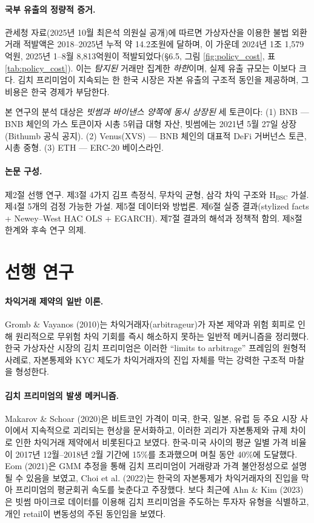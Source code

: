 \documentclass[11pt,a4paper]{article}
\begin{document}
\paragraph{국부 유출의 정량적 증거.}
관세청 자료(2025년 10월 최은석 의원실 공개)에 따르면 가상자산을 이용한 불법 외환거래
적발액은 2018--2025년 누적 약 14.2조원에 달하며, 이 가운데 2024년 1조 1,579억원,
2025년 1--8월 8,813억원이 적발되었다(\S6.5, 그림 \ref{fig:policy_cost}, 표 \ref{tab:policy_cost}).
이는 \emph{탐지된} 거래만 집계한 \emph{하한}이며, 실제 유출 규모는 이보다 크다. 김치 프리미엄이
지속되는 한 한국 시장은 자본 유출의 구조적 동인을 제공하며, 그 비용은 한국 경제가 부담한다.

본 연구의 분석 대상은 \emph{빗썸과 바이낸스 양쪽에 동시 상장된} 세 토큰이다: (1) BNB --- BNB 체인의 가스 토큰이자 시총 5위급 대형 자산, 빗썸에는 2021년 5월 27일 상장(Bithumb 공식 공지). (2) Venus(XVS) --- BNB 체인의 대표적 DeFi 거버넌스 토큰, 시총 중형. (3) ETH --- ERC-20 베이스라인.

\paragraph{논문 구성.} 제2절 선행 연구. 제3절 4가지 김프 측정식, 무차익 균형, 삼각 차익 구조와 H$_{\text{BSC}}$ 가설.
제4절 5개의 검정 가능한 가설. 제5절 데이터와 방법론. 제6절 실증 결과(stylized facts + Newey--West HAC OLS + EGARCH).
제7절 결과의 해석과 정책적 함의. 제8절 한계와 후속 연구 의제.

\section{선행 연구}

\paragraph{차익거래 제약의 일반 이론.}
Gromb \& Vayanos (2010)는 차익거래자(arbitrageur)가 자본 제약과 위험 회피로 인해
원리적으로 무위험 차익 기회를 즉시 해소하지 못하는 일반적 메커니즘을 정리했다.
한국 가상자산 시장의 김치 프리미엄은 이러한 ``limits to arbitrage'' 프레임의
원형적 사례로, 자본통제와 KYC 제도가 차익거래자의 진입 자체를 막는 강력한
구조적 마찰을 형성한다.

\paragraph{김치 프리미엄의 발생 메커니즘.}
Makarov \& Schoar (2020)은 비트코인 가격이 미국, 한국, 일본, 유럽 등 주요 시장 사이에서
지속적으로 괴리되는 현상을 문서화하고, 이러한 괴리가 자본통제와 규제 차이로 인한 차익거래 제약에서
비롯된다고 보였다. 한국-미국 사이의 평균 일별 가격 비율이 2017년 12월--2018년 2월 기간에 15\%를
초과했으며 며칠 동안 40\%에 도달했다. Eom (2021)은 GMM 추정을 통해 김치 프리미엄이 거래량과 가격
불안정성으로 설명될 수 있음을 보였고, Choi et al. (2022)는 한국의 자본통제가 차익거래자의 진입을 막아
프리미엄의 평균회귀 속도를 늦춘다고 주장했다. 보다 최근에 Ahn \& Kim (2023)은 빗썸 마이크로 데이터를
이용해 김치 프리미엄을 주도하는 투자자 유형을 식별하고, 개인 retail이 변동성의 주된 동인임을 보였다.
\end{document}
